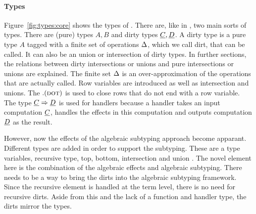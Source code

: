 \paragraph{Types}
Figure~\ref{fig:types:core} shows the types of \core. There are, like in \eff, two main sorts of types. There are (pure) types $A, B$ and dirty types $\underline{C}, \underline{D}$. A dirty type is a pure type $A$ tagged with a finite set of operations $\Delta$, which we call dirt, that can be called. It can also be an union or intersection of dirty types. In further sections, the relations between dirty intersections or unions and pure intersections or unions are explained. The finite set $\Delta$ is an over-approximation of the operations that are actually called. Row variables are introduced as well as intersection and unions. The $. (\textsc{dot})$ is used to close rows that do not end with a row variable. The type $\underline{C} \Rightarrow \underline{D}$ is used for handlers because a handler takes an input computation $\underline{C}$, handles the effects in this computation and outputs computation $\underline{D}$ as the result. \cite{handling}

However, now the effects of the algebraic subtyping approach become apparant. Different types are added in order to support the subtyping. These are a type variables, recursive type, top, bottom, intersection and union \cite{mlsub}. The novel element here is the combination of the algebraic effects and algebraic subtyping. There needs to be a way to bring the dirts into the algebraic subtyping framework. Since the recursive element is handled at the term level, there is no need for recursive dirts. Aside from this and the lack of a function and handler type, the dirts mirror the types.

